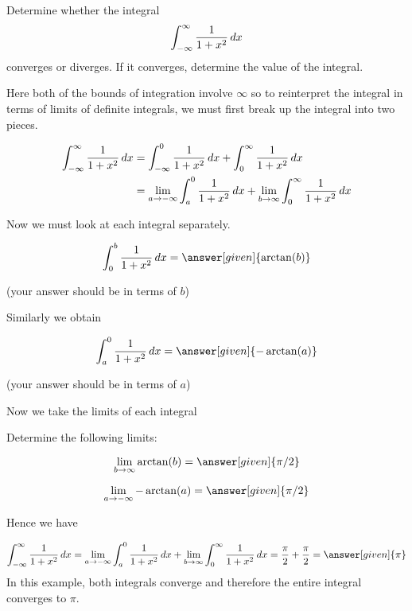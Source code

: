 \documentclass{ximera}
\begin{document}
\begin{example}
Determine whether the integral
\[
\int_{-\infty}^{\infty} \frac{1}{1+x^2} \mathop{}\!d x 
\]
converges or diverges. If it converges, determine the value of the integral. 
\begin{explanation}
Here both of the bounds of integration involve $\infty$ so to reinterpret the integral in terms of limits of definite integrals, 
we must first break up the integral into two pieces.

\begin{align*}
\int_{-\infty}^{\infty} \frac{1}{1+x^2} \mathop{}\!d x&= \int_{-\infty}^{0} \frac{1}{1+x^2} \mathop{}\!d x + \int_{0}^{\infty} \frac{1}{1+x^2} \mathop{}\!d x \\
& =\lim_{a \to -\infty} \int_{a}^{0} \frac{1}{1+x^2} \mathop{}\!d x + \lim_{b \to \infty} \int_{0}^{\infty} \frac{1}{1+x^2} \mathop{}\!d x 
\end{align*}
 
Now we must look at each integral separately. 

\[
\int_{0}^{b} \frac{1}{1+x^2} \d x =  \answer[given]{\arctan(b)}
\]
\begin{onlineOnly}
(your answer should be in terms of $b$)
\end{onlineOnly}
Similarly we obtain

\[
\int_{a}^{0} \frac{1}{1+x^2} \d x= \answer[given]{-\arctan(a)}
\]
\begin{onlineOnly}
 (your answer should be in terms of $a$)
 \end{onlineOnly}

Now we take the limits of each integral

\begin{question}
Determine the following limits:

 \begin{prompt}
   \[
    \lim_{b\to\infty} \arctan(b) = \answer[given]{\pi/2}
    \]

\[
\lim_{a \to -\infty} -\arctan(a)=\answer[given]{\pi/2}
\]
  \end{prompt}
\end{question}

Hence we have

\[
\int_{-\infty}^{\infty} \frac{1}{1+x^2} \d x=\lim_{a \to -\infty} \int_{a}^{0} \frac{1}{1+x^2} \d x + \lim_{b \to \infty} \int_{0}^{\infty} \frac{1}{1+x^2} \d x =\frac{\pi}{2}+\frac{\pi}{2} = \answer[given]{\pi}\]
In this example, both integrals converge and therefore the entire integral converges to $\pi$. 
\end{explanation}
\end{example}
\end{document}
